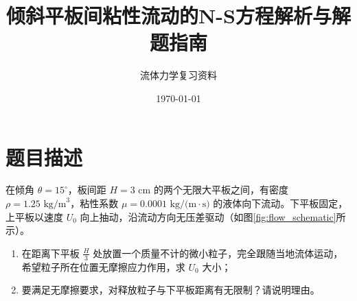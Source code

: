\documentclass[11pt,a4paper]{article}
\begin{document}
\title{\textbf{倾斜平板间粘性流动的N-S方程解析与解题指南}}
\author{流体力学复习资料}
\date{\today}
\maketitle

\section{题目描述}
在倾角 $\theta = 15^\circ$，板间距 $H = 3\text{ cm}$ 的两个无限大平板之间，有密度 $\rho = 1.25\text{ kg/m}^3$，粘性系数 $\mu = 0.0001\text{ kg/(m}\cdot\text{s)}$ 的液体向下流动。下平板固定，上平板以速度 $U_0$ 向上抽动，沿流动方向无压差驱动（如图\ref{fig:flow_schematic}所示）。

\begin{enumerate}
    \item 在距离下平板 $\frac{H}{3}$ 处放置一个质量不计的微小粒子，完全跟随当地流体运动，希望粒子所在位置无摩擦应力作用，求 $U_0$ 大小；
    \item 要满足无摩擦要求，对释放粒子与下平板距离有无限制？请说明理由。
\end{enumerate}
\end{document}
